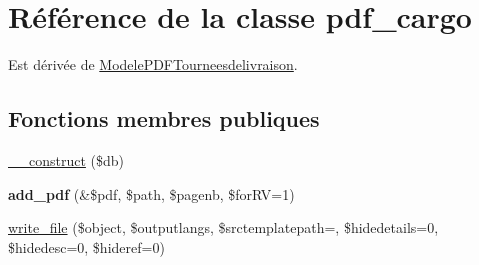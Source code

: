 \hypertarget{classpdf__cargo}{}\section{Référence de la classe pdf\+\_\+cargo}
\label{classpdf__cargo}


Est dérivée de \hyperlink{classModelePDFTourneesdelivraison}{Modele\+P\+D\+F\+Tourneesdelivraison}.

\subsection*{Fonctions membres publiques}
\begin{DoxyCompactItemize}
\item 
\hyperlink{classpdf__cargo_a60d7fe0266531b0e079725d2fd5a7f07}{\+\_\+\+\_\+construct} (\$db)
\item 
\mbox{\label{classpdf__cargo_ae728e40f89680a26e5b869d73f2f9a2c}} 
{\bfseries add\+\_\+pdf} (\&\$pdf, \$path, \$pagenb, \$for\+RV=1)
\item 
\hyperlink{classpdf__cargo_a033f9cf124e6e90670362436aab68456}{write\+\_\+file} (\$object, \$outputlangs, \$srctemplatepath=\textquotesingle{}\textquotesingle{}, \$hidedetails=0, \$hidedesc=0, \$hideref=0)
\end{DoxyCompactItemize}
